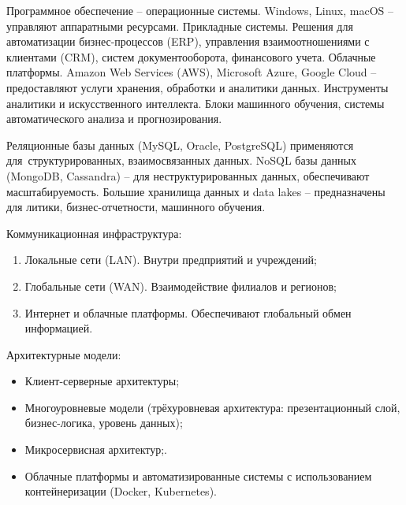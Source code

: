 \documentclass{ou}
\begin{document}
Программное обеспечение -- операционные системы. Windows, Linux, macOS -- управляют аппаратными ресурсами. Прикладные системы. Решения для автоматизации бизнес-процессов (ERP), управления взаимоотношениями с клиентами (CRM), систем документооборота, финансового учета. Облачные платформы. Amazon Web Services (AWS), Microsoft Azure, Google Cloud -- предоставляют услуги хранения, обработки и аналитики данных. Инструменты аналитики и искусственного интеллекта. Блоки машинного обучения, системы автоматического анализа и прогнозирования.

Реляционные базы данных (MySQL, Oracle, PostgreSQL) применяются для~структурированных, взаимосвязанных данных. NoSQL базы данных (MongoDB, Cassandra) -- для неструктурированных данных, обеспечивают масштабируемость. Большие хранилища данных и data lakes -- предназначены для литики, бизнес-отчетности, машинного обучения.

Коммуникационная инфраструктура:
\begin{enumerate}[leftmargin=0em, itemindent=3.75em, nosep, label=\arabic*)]
\item Локальные сети (LAN). Внутри предприятий и учреждений;
\item Глобальные сети (WAN). Взаимодействие филиалов и регионов;
\item Интернет и облачные платформы. Обеспечивают глобальный обмен информацией.
\end{enumerate}

Архитектурные модели:
\begin{itemize}[label=-, leftmargin=0em, itemindent=3.35em, nosep]
\item Клиент-серверные архитектуры;
\item Многоуровневые модели (трёхуровневая архитектура: презентационный слой, бизнес-логика, уровень данных);
\item Микросервисная архитектур;.
\item Облачные платформы и автоматизированные системы с использованием контейнеризации (Docker, Kubernetes).
\end{itemize}
\end{document}
